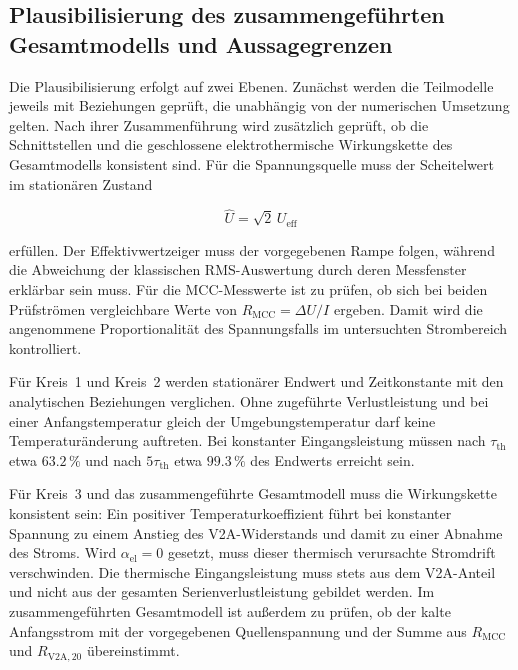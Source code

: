 
\subsection{Plausibilisierung des zusammengeführten Gesamtmodells und
Aussagegrenzen}
\label{sec:kap5_plausibilisierung_grenzen}

Die Plausibilisierung erfolgt auf zwei Ebenen. Zunächst werden die Teilmodelle
jeweils mit Beziehungen geprüft, die unabhängig von der numerischen Umsetzung
gelten. Nach ihrer Zusammenführung wird zusätzlich geprüft, ob die
Schnittstellen und die geschlossene elektrothermische Wirkungskette des
Gesamtmodells konsistent sind. Für die Spannungsquelle muss der Scheitelwert
im stationären Zustand

\begin{equation}
    \hat U=\sqrt{2}\,U_\mathrm{eff}
    \label{eq:kap5_plausi_scheitelwert}
\end{equation}

erfüllen. Der Effektivwertzeiger muss der vorgegebenen Rampe folgen, während
die Abweichung der klassischen RMS-Auswertung durch deren Messfenster
erklärbar sein muss. Für die MCC-Messwerte ist zu prüfen, ob sich bei beiden
Prüfströmen vergleichbare Werte von \(R_\mathrm{MCC}=\Delta U/I\) ergeben.
Damit wird die angenommene Proportionalität des Spannungsfalls im untersuchten
Strombereich kontrolliert.

Für Kreis~1 und Kreis~2 werden stationärer Endwert und Zeitkonstante mit den
analytischen Beziehungen verglichen. Ohne zugeführte Verlustleistung und bei
einer Anfangstemperatur gleich der Umgebungstemperatur darf keine
Temperaturänderung auftreten. Bei konstanter Eingangsleistung müssen nach
\(\tau_\mathrm{th}\) etwa \(63.2\,\%\) und nach
\(5\tau_\mathrm{th}\) etwa \(99.3\,\%\) des Endwerts erreicht sein.

Für Kreis~3 und das zusammengeführte Gesamtmodell muss die Wirkungskette
konsistent sein: Ein positiver Temperaturkoeffizient führt bei konstanter
Spannung zu einem Anstieg des V2A-Widerstands und damit zu einer Abnahme des
Stroms. Wird \(\alpha_\mathrm{el}=0\) gesetzt, muss dieser thermisch
verursachte Stromdrift verschwinden. Die thermische Eingangsleistung muss
stets aus dem V2A-Anteil und nicht aus der gesamten Serienverlustleistung
gebildet werden. Im zusammengeführten Gesamtmodell ist außerdem zu prüfen,
ob der kalte Anfangsstrom mit der vorgegebenen Quellenspannung und der Summe
aus \(R_\mathrm{MCC}\) und \(R_\mathrm{V2A,20}\) übereinstimmt.

